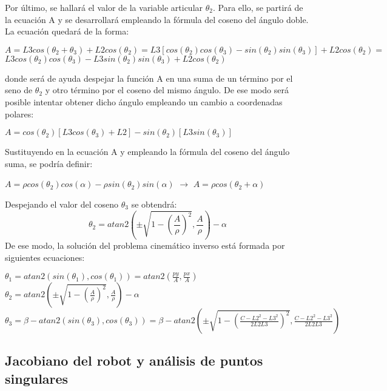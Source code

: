 	\newpage
	Por último, se hallará el valor de la variable articular $\theta_{2}$. Para ello, se partirá de la ecuación A y se desarrollará empleando la fórmula del coseno del ángulo doble. La ecuación quedará de la forma: \\
	\begin{center}
		$A=L3cos(\theta_{2}+\theta_{3})+L2cos(\theta_{2})=L3[cos(\theta_{2})cos(\theta_{3})-sin(\theta_{2})sin(\theta_{3})]+L2cos(\theta_{2})=$\\ \vspace{0.3cm} $L3cos(\theta_{2})cos(\theta_{3})-L3sin(\theta_{2})sin(\theta_{3})+L2cos(\theta_{2})$
	\end{center}
donde será de ayuda despejar la función A en una suma de un término por el seno de $ \theta_{2}$ y otro término por el coseno del mismo ángulo. De ese modo será posible intentar obtener dicho ángulo empleando un cambio a coordenadas polares:
	\begin{center}
		$A=cos(\theta_{2})[L3cos(\theta_{3})+L2]-sin(\theta_{2})[L3sin(\theta_{3})]$\\
		\vspace{0.3cm}
		\hfill
	\end{center}
	Sustituyendo en la ecuación A y empleando la fórmula del coseno del ángulo suma, se podría definir:\\
	\begin{center}
	$A=\rho cos(\theta_{2})cos(\alpha)-\rho sin(\theta_{2})sin(\alpha)$ $\rightarrow$ $A=\rho cos(\theta_{2}+\alpha)$
	\end{center}

	Despejando el valor del coseno $\theta_{3}$ se obtendrá:
	\begin{equation}
	\theta_{2}=atan2(\pm \sqrt{1-(\frac{A}{\rho})^{2}},\frac{A}{\rho})-\alpha
	\end{equation}
	De ese modo, la solución del problema cinemático inverso está formada por siguientes ecuaciones:
	\begin{center}
		$\theta_{1}=atan2(sin(\theta_{1}),cos(\theta_{1}))=atan2(\frac{py}{A},\frac{px}{A})$ \\
		$\theta_{2}=atan2(\pm \sqrt{1-(\frac{A}{\rho})^{2}},\frac{A}{\rho})-\alpha$ \\
		$\theta_{3}=\beta -atan2(sin(\theta_{3}),cos(\theta_{3}))=\beta-atan2(\pm \sqrt{1-(\frac{C-L2^{2}-L3^{2}}{2L2L3})^{2}},\frac{C-L2^{2}-L3^{2}}{2L2L3} )$
	\end{center}
	\subsection{Jacobiano del robot y análisis de puntos singulares}

